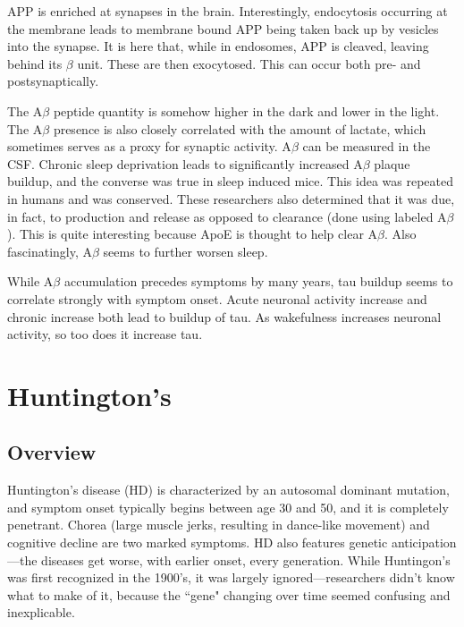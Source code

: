 APP is enriched at synapses in the brain. Interestingly, endocytosis occurring at the membrane leads to membrane bound APP being taken back up by vesicles into the synapse. It is here that, while in endosomes, APP is cleaved, leaving behind its $\beta$ unit. These are then exocytosed. This can occur both pre- and postsynaptically.\newline

The A$\beta$ peptide quantity is somehow higher in the dark and lower in the light. The A$\beta$ presence is also closely correlated with the amount of lactate, which sometimes serves as a proxy for synaptic activity. A$\beta$ can be measured in the CSF. Chronic sleep deprivation leads to significantly increased A$\beta$ plaque buildup, and the converse was true in sleep induced mice. This idea was repeated in humans and was conserved. These researchers also determined that it was due, in fact, to production and release as opposed to clearance (done using labeled A$\beta$). This is quite interesting because ApoE is thought to help clear A$\beta$. Also fascinatingly, A$\beta$ seems to further worsen sleep.\newline

While A$\beta$ accumulation precedes symptoms by many years, tau buildup seems to correlate strongly with symptom onset. Acute neuronal activity increase and chronic increase both lead to buildup of tau. As wakefulness increases neuronal activity, so too does it increase tau.


\section{Huntington's}

\subsection*{Overview}

Huntington's disease (HD) is characterized by an autosomal dominant mutation, and symptom onset typically begins between age 30 and 50, and it is completely penetrant. Chorea (large muscle jerks, resulting in dance-like movement) and cognitive decline are two marked symptoms. HD also features genetic anticipation---the diseases get worse, with earlier onset, every generation. While Huntingon's was first recognized in the 1900's, it was largely ignored---researchers didn't know what to make of it, because the ``gene" changing over time seemed confusing and inexplicable. \newline

